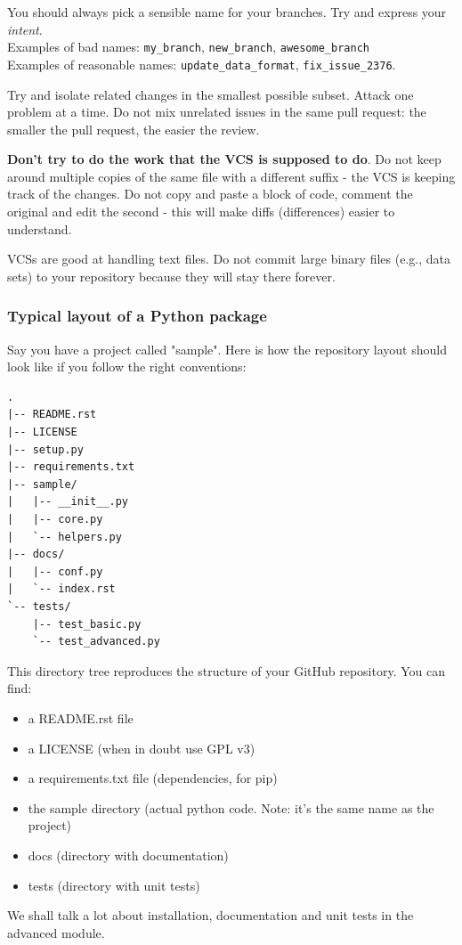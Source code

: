 You should always pick a sensible name for your branches. Try and express your \emph{intent}. \\ Examples of bad names: \verb|my_branch|, \verb|new_branch|, \verb|awesome_branch| \\ Examples of reasonable names: \verb|update_data_format|, \verb|fix_issue_2376|.

Try and isolate related changes in the smallest possible subset. Attack one problem at a time. Do not mix unrelated issues in the same pull request: the smaller the pull request, the easier the review.

\textbf{Don't try to do the work that the VCS is supposed to do}. Do not keep around multiple copies of the same file with a different suffix - the VCS is keeping track of the changes. Do not copy and paste a block of code, comment the original and edit the second - this will make diffs (differences) easier to understand.

VCSs are good at handling text files. Do not commit large binary files (e.g., data sets) to your repository because they will stay there forever.

\subsubsection{Typical layout of a Python package}
Say you have a project called "sample". Here is how the repository layout should look like if you follow the right conventions:

\begin{Verbatim}
.
|-- README.rst
|-- LICENSE
|-- setup.py
|-- requirements.txt
|-- sample/
|   |-- __init__.py
|   |-- core.py
|   `-- helpers.py
|-- docs/
|   |-- conf.py
|   `-- index.rst
`-- tests/
    |-- test_basic.py
    `-- test_advanced.py
\end{Verbatim}

This directory tree reproduces the structure of your GitHub repository. You can find:

\begin{itemize}
    \item[-] a README.rst file
    \item[-] a LICENSE (when in doubt use GPL v3)
    \item[-] a requirements.txt file (dependencies, for pip)
    \item[-] the sample directory (actual python code. Note: it's the same name as the project)
    \item[-] docs (directory with documentation)
    \item[-] tests (directory with unit tests)
\end{itemize}
We shall talk a lot about installation, documentation and unit tests in the advanced module.

